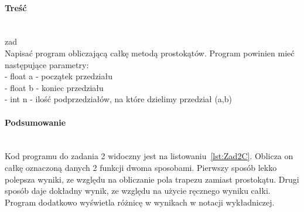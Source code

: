 \paragraph{Treść}~\\
{zad}\\
Napisać program obliczającą całkę metodą prostokątów.
Program powinien mieć następujące parametry:\\
- float a - początek przedziału\\
- float b - koniec przedziału\\
- int n - ilość podprzedziałów, na które dzielimy przedział (a,b)



\paragraph{Podsumowanie}~\\
Kod programu do zadania 2 widoczny jest na listowaniu~\ref{lst:Zad2C}.
Oblicza on całkę oznaczoną danych 2 funkcji dwoma sposobami.
Pierwszy sposób lekko polepsza wyniki, ze względu na obliczanie pola trapezu zamiast prostokątu.
Drugi sposób daje dokładny wynik, ze względu na użycie ręcznego wyniku całki.
Program dodatkowo wyświetla różnicę w wynikach w notacji wykładniczej.
